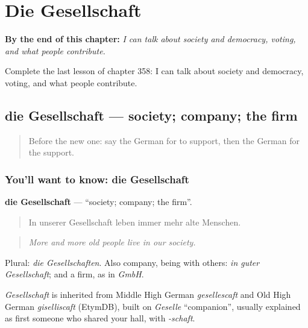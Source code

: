 
\chapter{Die Gesellschaft}
\label{ch:ge-die-gesellschaft}

\begin{chapteropening}
\textbf{By the end of this chapter:} \emph{I can talk about society and democracy, voting, and what people contribute.}

Complete the last lesson of chapter 358: I can talk about society and democracy, voting, and what people contribute.
\end{chapteropening}

\section[die Gesellschaft]{die Gesellschaft — society; company; the firm}

\label{lesson:GE-C358-gesellschaft}



\begin{quote}
Before the new one: say the German for to support, then the German for the support.
\end{quote}

\subsection*{You'll want to know: die Gesellschaft}
\textbf{die Gesellschaft} — \textquotedblleft{}society; company; the firm\textquotedblright{}.

\begin{quote}
In unserer Gesellschaft leben immer mehr alte Menschen.
\end{quote}

\begin{quote}
\emph{More and more old people live in our society.}
\end{quote}

Plural: \emph{die Gesellschaften}. Also company, being with others: \emph{in guter Gesellschaft}; and a firm, as in \emph{GmbH}.

\begin{cousinweb}
\emph{Gesellschaft} is inherited from Middle High German \emph{gesellescaft} and Old High German \emph{giselliscaft} (EtymDB), built on \emph{Geselle} \textquotedblleft{}companion\textquotedblright{}, usually explained as first someone who shared your hall, with \emph{-schaft}.
\end{cousinweb}

